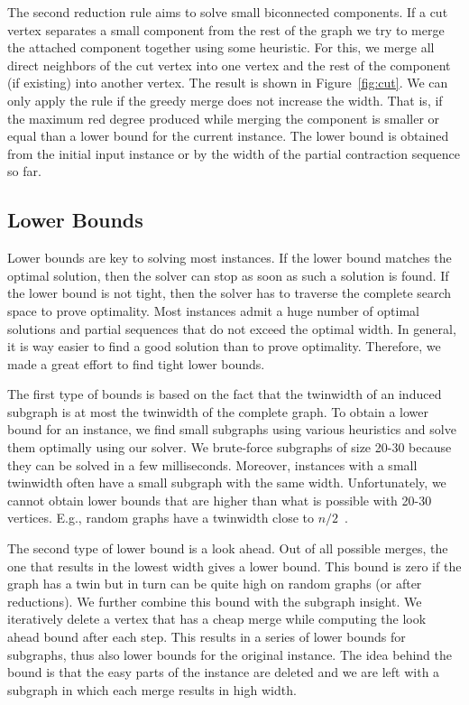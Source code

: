 \documentclass[a4paper,UKenglish,cleveref, autoref, thm-restate]{lipics-v2021}
\begin{document}
The second reduction rule aims to solve small biconnected components.
If a cut vertex separates a small component from the rest of the graph we try to merge the attached component together using some heuristic.
For this, we merge all direct neighbors of the cut vertex into one vertex and the rest of the component (if existing) into another vertex.
The result is shown in Figure~\ref{fig:cut}.
We can only apply the rule if the greedy merge does not increase the width.
That is, if the maximum red degree produced while merging the component is smaller or equal than a lower bound for the current instance.
The lower bound is obtained from the initial input instance or by the width of the partial contraction sequence so far.


\subsection{Lower Bounds}
Lower bounds are key to solving most instances.
If the lower bound matches the optimal solution, then the solver can stop as soon as such a solution is found.
If the lower bound is not tight, then the solver has to traverse the complete search space to prove optimality.
Most instances admit a huge number of optimal solutions and partial sequences that do not exceed the optimal width.
In general, it is way easier to find a good solution than to prove optimality.
Therefore, we made a great effort to find tight lower bounds.

The first type of bounds is based on the fact that the twinwidth of an induced subgraph is at most the twinwidth of the complete graph.
To obtain a lower bound for an instance, we find small subgraphs using various heuristics and solve them optimally using our solver.
We brute-force subgraphs of size 20-30 because they can be solved in a few milliseconds.
Moreover, instances with a small twinwidth often have a small subgraph with the same width.
Unfortunately, we cannot obtain lower bounds that are higher than what is possible with 20-30 vertices.
E.g., random graphs have a twinwidth close to $n/2$~\cite{ahn2022twinwidth}.

The second type of lower bound is a look ahead.
Out of all possible merges, the one that results in the lowest width gives a lower bound.
This bound is zero if the graph has a twin but in turn can be quite high on random graphs (or after reductions).
We further combine this bound with the subgraph insight.
We iteratively delete a vertex that has a cheap merge while computing the look ahead bound after each step.
This results in a series of lower bounds for subgraphs, thus also lower bounds for the original instance.
The idea behind the bound is that the easy parts of the instance are deleted and we are left with a subgraph in which each merge results in high width.
\end{document}
